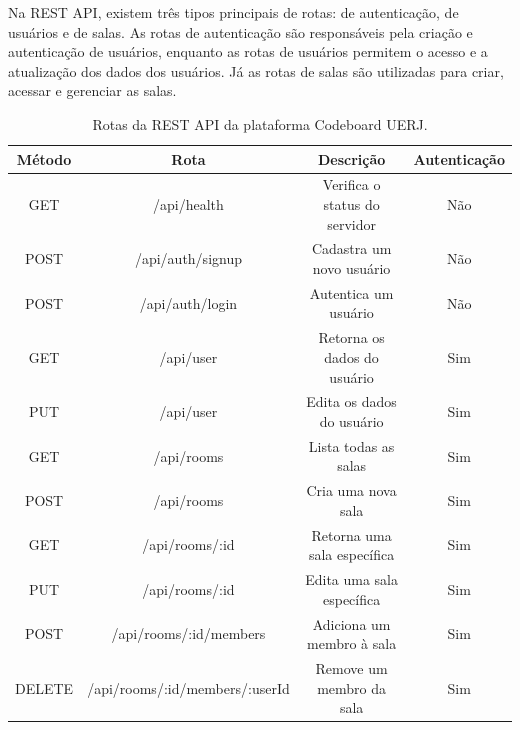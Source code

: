 Na REST API, existem três tipos principais de rotas: de autenticação, de usuários e de salas. As rotas de autenticação são responsáveis pela criação e autenticação de usuários, enquanto as rotas de usuários permitem o acesso e a atualização dos dados dos usuários. Já as rotas de salas são utilizadas para criar, acessar e gerenciar as salas.

\begin{table}[H]
    \centering
    \begin{tabular}{|c|c|c|c|}
        \hline
        \textbf{Método} & \textbf{Rota}                  & \textbf{Descrição}            & \textbf{Autenticação} \\
        \hline
        GET             & /api/health                    & Verifica o status do servidor & Não                   \\
        \hline
        POST            & /api/auth/signup               & Cadastra um novo usuário      & Não                   \\
        POST            & /api/auth/login                & Autentica um usuário          & Não                   \\
        \hline
        GET             & /api/user                      & Retorna os dados do usuário   & Sim                   \\
        PUT             & /api/user                      & Edita os dados do usuário     & Sim                   \\
        \hline
        GET             & /api/rooms                     & Lista todas as salas          & Sim                   \\
        POST            & /api/rooms                     & Cria uma nova sala            & Sim                   \\
        GET             & /api/rooms/:id                 & Retorna uma sala específica   & Sim                   \\
        PUT             & /api/rooms/:id                 & Edita uma sala específica     & Sim                   \\
        POST            & /api/rooms/:id/members         & Adiciona um membro à sala     & Sim                   \\
        DELETE          & /api/rooms/:id/members/:userId & Remove um membro da sala      & Sim                   \\
        \hline
    \end{tabular}
    \caption{Rotas da REST API da plataforma Codeboard UERJ.}
    \label{tab:rest-api-routes}
\end{table}


